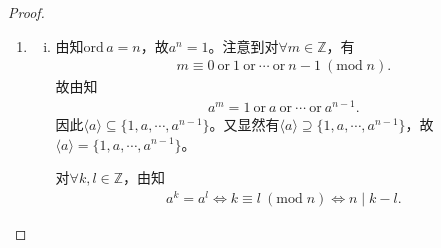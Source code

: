 \documentclass[../../main.tex]{subfiles}%
\begin{document}
\begin{proof}
\begin{enumerate}[(1)]
\begin{enumerate}[(i)]
对任意的$a^k \in G$,有$k \in \mathbb{Z}$,使$\phi(k) = a^k$,所以$\phi$是$\mathbb{Z}$到$G$的满映射;

对任意的$k,l \in \mathbb{Z}$,
\begin{align*}
\phi(k + l) = a^{k+l} = a^k \cdot a^l = \phi(k) \cdot \phi(l),
\end{align*}
所以$\phi$是$\mathbb{Z}$到$G$的同构映射.因此,$G \cong (\mathbb{Z},+)$.

{\color{blue}证法二:}作$\mathbb{Z}$到$G$上的映射$\varphi:\varphi(n)=a^n(n\in\mathbb{Z})$. 于是有
\[
\varphi(n_1+n_2)=a^{n_1+n_2}=a^{n_1}\cdot a^{n_2}=\varphi(n_1)\varphi(n_2),
\]
因而$\varphi$是$\mathbb{Z}$到$G$上的同态映射, 故由\hyperref[theorem:群的同态基本定理]{群的同态基本定理}知$G\cong \mathbb{Z}/\ker\varphi$且$\ker \varphi \lhd \mathbb{Z}$. 由知存在$m\in \mathbb{N}_0,$使得$\ker\varphi=m\mathbb{Z}$.因此$G\cong \mathbb{Z}/m\mathbb{Z}$.

若$m\neq 0$,则由知
\begin{align*}
G\cong\mathbb{Z}/m\mathbb{Z}=\mathbb{Z}_m.
\end{align*}
从而$|G|=|\mathbb{Z}_m|=m<\infty$,这与$|G|=\infty$矛盾!故此时$m=0,$因此$G\cong \mathbb{Z}.$
\end{enumerate}

\item \begin{enumerate}[(i)]
\item 由知$\text{ord}\,a=n$，故$a^n=1$。注意到对$\forall m\in \mathbb{Z}$，有
\begin{align*}
m\equiv 0\ \mathrm{or}\ 1\ \mathrm{or}\ \cdots\ \mathrm{or}\ n-1\ (\mathrm{mod}\;n).
\end{align*}
故由知
\begin{align*}
a^m=1\ \mathrm{or}\ a\ \mathrm{or}\ \cdots\ \mathrm{or}\ a^{n-1}.
\end{align*}
因此$\langle a\rangle \subseteq \{1,a,\cdots,a^{n-1}\}$。又显然有$\langle a\rangle \supseteq \{1,a,\cdots,a^{n-1}\}$，故$\langle a\rangle = \{1,a,\cdots,a^{n-1}\}$。

对$\forall k,l\in \mathbb{Z}$，由知
\begin{align*}
a^k=a^l \iff k\equiv l\ (\mathrm{mod}\;n) \iff n\mid k-l.
\end{align*}


\end{enumerate}
\end{enumerate}
\end{proof}
\end{document}
